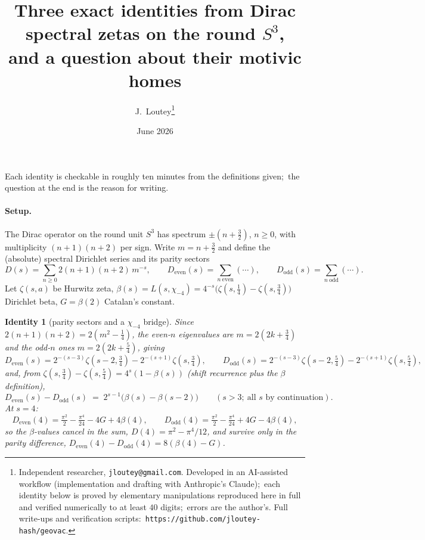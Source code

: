 \documentclass[11pt]{article}
\title{Three exact identities from Dirac spectral zetas on the round
$S^3$,\\ and a question about their motivic homes}
\author{J.~Loutey\thanks{Independent researcher,
\texttt{jloutey@gmail.com}. Developed in an AI-assisted workflow
(implementation and drafting with Anthropic's Claude);\ each identity
below is proved by elementary manipulations reproduced here in full
and verified numerically to at least $40$ digits;\ errors are the
author's. Full write-ups and verification scripts:\
\texttt{https://github.com/jloutey-hash/geovac}.}}
\date{June 2026}
\newtheorem{identity}{Identity}
\begin{document}
\maketitle

\noindent Each identity is checkable in roughly ten minutes from the
definitions given;\ the question at the end is the reason for
writing.

\paragraph{Setup.} The Dirac operator on the round unit $S^3$ has
spectrum $\pm(n + \tfrac32)$, $n \ge 0$, with multiplicity
$(n+1)(n+2)$ per sign. Write $m = n + \tfrac32$ and define the
(absolute) spectral Dirichlet series and its parity sectors
\begin{equation*}
  D(s) = \sum_{n \ge 0} 2(n+1)(n+2)\, m^{-s}, \qquad
  D_{\mathrm{even}}(s) = \!\!\sum_{n \ \mathrm{even}}\!\!(\cdots),
  \qquad
  D_{\mathrm{odd}}(s) = \!\!\sum_{n \ \mathrm{odd}}\!\!(\cdots).
\end{equation*}
Let $\zeta(s, a)$ be Hurwitz zeta, $\beta(s) = L(s, \chi_{-4}) =
4^{-s}\bigl(\zeta(s, \tfrac14) - \zeta(s, \tfrac34)\bigr)$ Dirichlet
beta, $G = \beta(2)$ Catalan's constant.

\begin{identity}[parity sectors and a $\chi_{-4}$ bridge]
Since $2(n+1)(n+2) = 2(m^2 - \tfrac14)$, the even-$n$ eigenvalues are
$m = 2(2k + \tfrac34)$ and the odd-$n$ ones $m = 2(2k + \tfrac54)$,
giving
\begin{equation*}
  D_{\mathrm{even}}(s) = 2^{-(s-3)}\zeta(s{-}2, \tfrac34)
                       - 2^{-(s+1)}\zeta(s, \tfrac34), \qquad
  D_{\mathrm{odd}}(s) = 2^{-(s-3)}\zeta(s{-}2, \tfrac54)
                       - 2^{-(s+1)}\zeta(s, \tfrac54),
\end{equation*}
and, from $\zeta(s, \tfrac34) - \zeta(s, \tfrac54)
= 4^s(1 - \beta(s))$ (shift recurrence plus the $\beta$ definition),
\begin{equation*}
  D_{\mathrm{even}}(s) - D_{\mathrm{odd}}(s)
  \;=\; 2^{s-1}\bigl(\beta(s) - \beta(s{-}2)\bigr)
  \qquad (s > 3;\ \text{all } s \text{ by continuation}).
\end{equation*}
At $s = 4$:
\begin{equation*}
  D_{\mathrm{even}}(4) = \tfrac{\pi^2}{2} - \tfrac{\pi^4}{24}
  - 4G + 4\beta(4), \qquad
  D_{\mathrm{odd}}(4) = \tfrac{\pi^2}{2} - \tfrac{\pi^4}{24}
  + 4G - 4\beta(4),
\end{equation*}
so the $\beta$-values cancel in the sum,
$D(4) = \pi^2 - \pi^4/12$, and survive only in the parity
difference, $D_{\mathrm{even}}(4) - D_{\mathrm{odd}}(4)
= 8(\beta(4) - G)$.
\end{identity}
\end{document}
